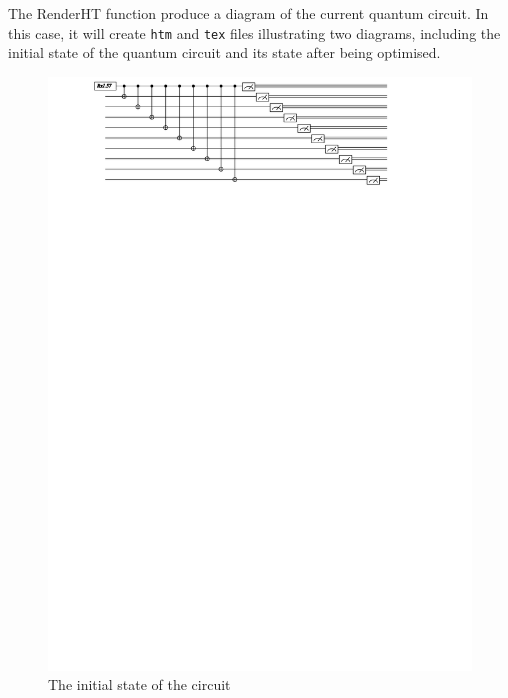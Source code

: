 \documentclass[12pt]{third-rep}
\begin{document}
The RenderHT function produce a diagram of the current quantum circuit. In this case, it will create \texttt{htm} and \texttt{tex} files illustrating two diagrams, including the initial state of the quantum circuit and its state after being optimised.
\begin{figure}[ht]
\centering
\includegraphics[width=15cm]{circuit1}
\caption{The initial state of the circuit}
\end{figure}
\end{document}

